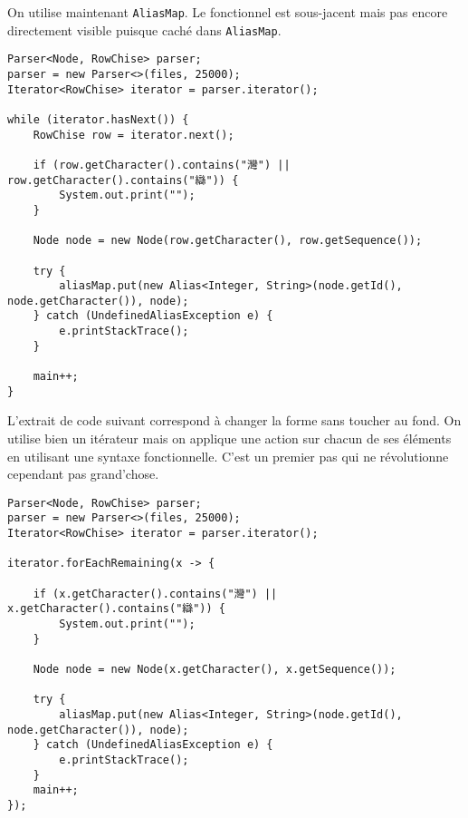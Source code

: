 On utilise maintenant \texttt{AliasMap}. Le fonctionnel est sous-jacent mais pas encore directement visible puisque caché dans \texttt{AliasMap}.
\begin{lstlisting}[caption={Impératif pur. Avec \texttt{AliasMap}}]
Parser<Node, RowChise> parser;
parser = new Parser<>(files, 25000);
Iterator<RowChise> iterator = parser.iterator();

while (iterator.hasNext()) {
	RowChise row = iterator.next();

	if (row.getCharacter().contains("灣") || row.getCharacter().contains("䜌")) {
		System.out.print("");
	}

	Node node = new Node(row.getCharacter(), row.getSequence());

	try {
		aliasMap.put(new Alias<Integer, String>(node.getId(), node.getCharacter()), node);
	} catch (UndefinedAliasException e) {
		e.printStackTrace();
	}

	main++;
}
\end{lstlisting}

L'extrait de code suivant correspond à changer la forme sans toucher au fond. On utilise bien un itérateur mais on applique une action sur chacun de ses éléments en utilisant une syntaxe fonctionnelle. C'est un premier pas qui ne révolutionne cependant pas grand'chose.
\begin{lstlisting}[caption={Premier pas de fonctionnel}]
Parser<Node, RowChise> parser;
parser = new Parser<>(files, 25000);
Iterator<RowChise> iterator = parser.iterator();

iterator.forEachRemaining(x -> {

	if (x.getCharacter().contains("灣") || x.getCharacter().contains("䜌")) {
		System.out.print("");
	}

	Node node = new Node(x.getCharacter(), x.getSequence());

	try {
		aliasMap.put(new Alias<Integer, String>(node.getId(), node.getCharacter()), node);
	} catch (UndefinedAliasException e) {
		e.printStackTrace();
	}
	main++;
});
\end{lstlisting}